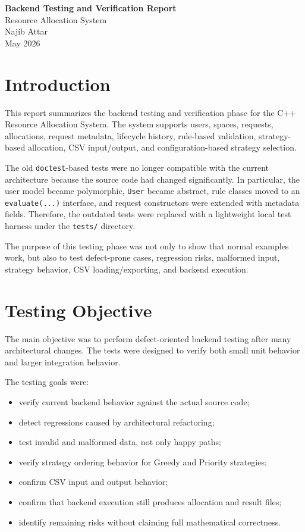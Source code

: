 \documentclass[12pt,a4paper]{article}
\begin{document}
\begin{center}
    {\LARGE \textbf{Backend Testing and Verification Report}}\\[0.4cm]
    {\large Resource Allocation System}\\[0.3cm]
    Najib Attar\\
    May 2026
\end{center}

\section{Introduction}

This report summarizes the backend testing and verification phase for the C++ Resource Allocation System. The system supports users, spaces, requests, allocations, request metadata, lifecycle history, rule-based validation, strategy-based allocation, CSV input/output, and configuration-based strategy selection.

The old \texttt{doctest}-based tests were no longer compatible with the current architecture because the source code had changed significantly. In particular, the user model became polymorphic, \texttt{User} became abstract, rule classes moved to an \texttt{evaluate(...)} interface, and request constructors were extended with metadata fields. Therefore, the outdated tests were replaced with a lightweight local test harness under the \texttt{tests/} directory.

The purpose of this testing phase was not only to show that normal examples work, but also to test defect-prone cases, regression risks, malformed input, strategy behavior, CSV loading/exporting, and backend execution.

\section{Testing Objective}

The main objective was to perform defect-oriented backend testing after many architectural changes. The tests were designed to verify both small unit behavior and larger integration behavior.

The testing goals were:

\begin{itemize}
    \item verify current backend behavior against the actual source code;
    \item detect regressions caused by architectural refactoring;
    \item test invalid and malformed data, not only happy paths;
    \item verify strategy ordering behavior for Greedy and Priority strategies;
    \item confirm CSV input and output behavior;
    \item confirm that backend execution still produces allocation and result files;
    \item identify remaining risks without claiming full mathematical correctness.
\end{itemize}
\end{document}
